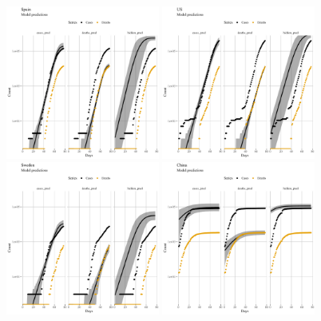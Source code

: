 \documentclass[a4paper]{tufte-handout}
\begin{document}
\begin{figure}
\begin{center}
    \includegraphics[width=0.45\textwidth]{figs/model_pred_ESP.pdf}
    \includegraphics[width=0.45\textwidth]{figs/model_pred_USA.pdf}
    \includegraphics[width=0.45\textwidth]{figs/model_pred_SWE.pdf}
    \includegraphics[width=0.45\textwidth]{figs/model_pred_CHN.pdf}

\end{center}
\end{figure}
\end{document}
